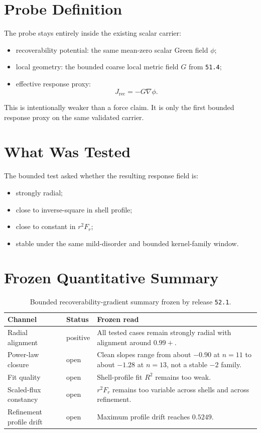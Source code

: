 \documentclass[11pt]{article}
\begin{document}
\section{Probe Definition}

The probe stays entirely inside the existing scalar carrier:
\begin{itemize}
\item recoverability potential: the same mean-zero scalar Green field \(\phi\);
\item local geometry: the bounded coarse local metric field \(G\) from \texttt{51.4};
\item effective response proxy:
\[
J_{\mathrm{rec}} = - G \nabla \phi.
\]
\end{itemize}

This is intentionally weaker than a force claim. It is only the first bounded response proxy on the same validated carrier.

\section{What Was Tested}

The bounded test asked whether the resulting response field is:
\begin{itemize}
\item strongly radial;
\item close to inverse-square in shell profile;
\item close to constant in \(r^2 F_r\);
\item stable under the same mild-disorder and bounded kernel-family window.
\end{itemize}

\section{Frozen Quantitative Summary}

\begin{table}[h!]
\centering
\begin{tabular}{@{}p{3.7cm}p{2.0cm}p{7.9cm}@{}}
\toprule
Channel & Status & Frozen read \\
\midrule
Radial alignment & positive & All tested cases remain strongly radial with alignment around \(0.99+\). \\
Power-law closure & open & Clean slopes range from about \(-0.90\) at \(n=11\) to about \(-1.28\) at \(n=13\), not a stable \(-2\) family. \\
Fit quality & open & Shell-profile fit \(R^2\) remains too weak. \\
Scaled-flux constancy & open & \(r^2 F_r\) remains too variable across shells and across refinement. \\
Refinement profile drift & open & Maximum profile drift reaches \(0.5249\). \\
\bottomrule
\end{tabular}
\caption{Bounded recoverability-gradient summary frozen by release \texttt{52.1}.}
\end{table}
\end{document}
